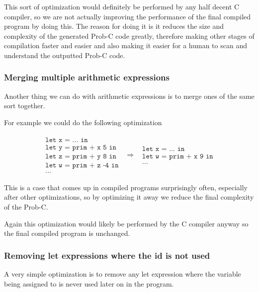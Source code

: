 \documentclass[a4paper]{article}
\newcommand{\optimization}[2]{
	\[
		\begin{array}{rcl}
			#1 & \Rightarrow & #2
		\end{array}
	\]
}
\begin{document}
This sort of optimization would definitely be performed by any half decent C compiler, so we are not actually improving the performance of the final compiled program by doing this. The reason for doing it is it reduces the size and complexity of the generated Prob-C code greatly, therefore making other stages of compilation faster and easier and also making it easier for a human to scan and understand the outputted Prob-C code.



\subsubsection{Merging multiple arithmetic expressions}

Another thing we can do with arithmetic expressions is to merge ones of the same sort together.

For example we could do the following optimization

\optimization{
	\begin{array}{l}
		\texttt{let x = ... in} \\
		\texttt{let y = prim + x 5 in} \\
		\texttt{let z = prim + y 8 in} \\
		\texttt{let w = prim + z -4 in} \\
		\texttt{...}
	\end{array}
}{
	\begin{array}{l}
		\texttt{let x = ... in} \\
		\texttt{let w = prim + x 9 in} \\
		\texttt{...}
	\end{array}
}

This is a case that comes up in compiled programs surprisingly often, especially after other optimizations, so by optimizing it away we reduce the final complexity of the Prob-C.

Again this optimization would likely be performed by the C compiler anyway so the final compiled program is unchanged.



\subsubsection{Removing let expressions where the id is not used}

A very simple optimization is to remove any let expression where the variable being assigned to is never used later on in the program.
\end{document}
